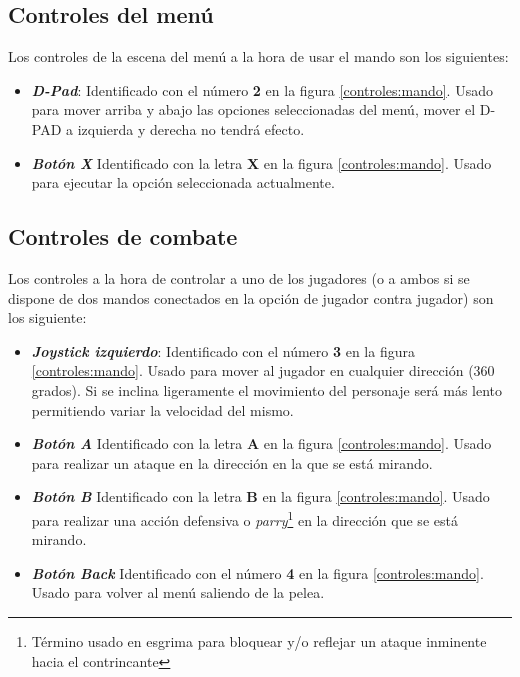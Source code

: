 \subsection{Controles del menú}

Los controles de la escena del menú a la hora de usar el mando son los siguientes:

\begin{itemize}
	\item \textbf{\textit{D-Pad}}: Identificado con el número \textbf{2} en la figura \ref{controles:mando}. Usado para mover arriba y abajo las opciones seleccionadas del menú, mover el D-PAD a izquierda y derecha no tendrá efecto.
	\item \textbf{\textit{Botón X}} Identificado con la letra \textbf{X} en la figura \ref{controles:mando}. Usado para ejecutar la opción seleccionada actualmente.
\end{itemize}

\subsection{Controles de combate}

Los controles a la hora de controlar a uno de los jugadores (o a ambos si se dispone de dos mandos conectados en la opción de jugador contra jugador) son los siguiente:

\begin{itemize}
	\item \textbf{\textit{Joystick izquierdo}}: Identificado con el número \textbf{3} en la figura \ref{controles:mando}. Usado para mover al jugador en cualquier dirección (360 grados). Si se inclina ligeramente el movimiento del personaje será más lento permitiendo variar la velocidad del mismo.
	\item \textbf{\textit{Botón A}} Identificado con la letra \textbf{A} en la figura \ref{controles:mando}. Usado para realizar un ataque en la dirección en la que se está mirando.
	\item \textbf{\textit{Botón B}} Identificado con la letra \textbf{B} en la figura \ref{controles:mando}. Usado para realizar una acción defensiva o \textit{parry}\footnote{Término usado en esgrima para bloquear y/o reflejar un ataque inminente hacia el contrincante} en la dirección que se está mirando.
	\item \textbf{\textit{Botón Back}} Identificado con el número \textbf{4} en la figura \ref{controles:mando}. Usado para volver al menú saliendo de la pelea.
\end{itemize}

